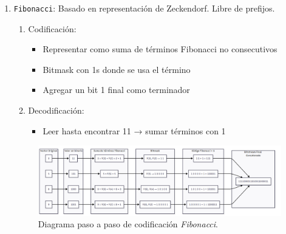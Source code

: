 \begin{enumerate}
\begin{enumerate}
            \item \texttt{Fibonacci}:
            Basado en representación de Zeckendorf. Libre de prefijos.
            \begin{enumerate}
                \item Codificación:
                \begin{itemize}
                    \item Representar como suma de términos Fibonacci no consecutivos
                    \item Bitmask con 1s donde se usa el término
                    \item Agregar un bit 1 final como terminador
                \end{itemize}
                \item Decodificación:
                \begin{itemize}
                    \item Leer hasta encontrar 11 → sumar términos con 1
                \end{itemize}
            \end{enumerate}
            \begin{figure}[H]
                \centering
                \includegraphics[width=0.9\linewidth]{alternatives/images/enc_vector_fibonacci.png}
                \caption[Ejemplo \textit{Fibonacci}]{Diagrama paso a paso de codificación \textit{Fibonacci}.}
                \label{enc_vector_fibonacci}
            \end{figure}


\end{enumerate}
\end{enumerate}
